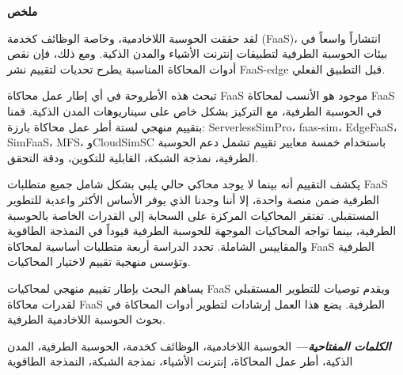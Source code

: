 \newpage
{}
\vspace*{4cm}
\begin{center}
    {\Large\bf ملخص}
\end{center} \vskip 0.5cm

لقد حققت الحوسبة اللاخادمية، وخاصة الوظائف كخدمة (FaaS)، انتشاراً واسعاً في بيئات الحوسبة الطرفية لتطبيقات إنترنت الأشياء والمدن الذكية. ومع ذلك، فإن نقص أدوات المحاكاة المناسبة يطرح تحديات لتقييم نشر FaaS-edge قبل التطبيق الفعلي.

تبحث هذه الأطروحة في أي إطار عمل محاكاة FaaS موجود هو الأنسب لمحاكاة FaaS في الحوسبة الطرفية، مع التركيز بشكل خاص على سيناريوهات المدن الذكية. قمنا بتقييم منهجي لستة أطر عمل محاكاة بارزة: ServerlessSimPro، faas-sim، EdgeFaaS، SimFaaS، MFS، وCloudSimSC باستخدام خمسة معايير تقييم تشمل دعم الحوسبة الطرفية، نمذجة الشبكة، القابلية للتكوين، ودقة التحقق.

يكشف التقييم أنه بينما لا يوجد محاكي حالي يلبي بشكل شامل جميع متطلبات FaaS الطرفية ضمن منصة واحدة، إلا أننا وجدنا الذي يوفر الأساس الأكثر واعدية للتطوير المستقبلي. تفتقر المحاكيات المركزة على السحابة إلى القدرات الخاصة بالحوسبة الطرفية، بينما تواجه المحاكيات الموجهة للحوسبة الطرفية قيوداً في النمذجة الطاقوية والمقاييس الشاملة. تحدد الدراسة أربعة متطلبات أساسية لمحاكاة FaaS الطرفية وتؤسس منهجية تقييم لاختيار المحاكيات.

يساهم البحث بإطار تقييم منهجي لمحاكيات FaaS ويقدم توصيات للتطوير المستقبلي لقدرات محاكاة FaaS الطرفية. يضع هذا العمل إرشادات لتطوير أدوات المحاكاة في بحوث الحوسبة اللاخادمية الطرفية.

\providecommand{\keywordsar}[1] {
  \small
  \textbf{\textit{الكلمات المفتاحية---}} #1
}
\keywordsar{الحوسبة اللاخادمية، الوظائف كخدمة، الحوسبة الطرفية، المدن الذكية، أطر عمل المحاكاة، إنترنت الأشياء، نمذجة الشبكة، النمذجة الطاقوية}
